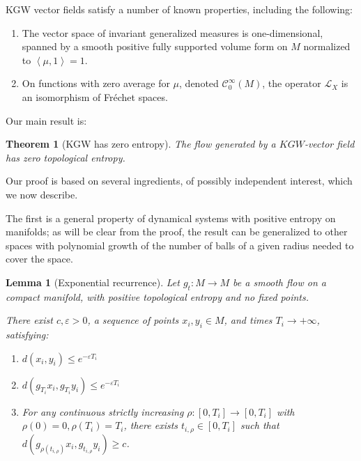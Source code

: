 \documentclass[11pt]{amsart}
\newcommand \cC {\mathcal{C}}
\newcommand \cL {\mathcal{L}}
\newcommand{\ip}[1]{\left\langle#1\right\rangle}
\newcommand{\Frechet}     {\xspace{{F}r\'echet}\xspace}
\newcommand{\ve}{\varepsilon}
\theoremstyle{mytheoremstyle}
\theoremstyle{mydefinitionstyle}
\theoremstyle{mytheoremstyle}
\newtheorem{theorem}{Theorem}[section]
\numberwithin{equation}{section}
\newtheorem{lemma}[lemma]{Lemma}
\theoremstyle{mydefinitionstyle}
\begin{document}
KGW vector fields satisfy a number of known properties, including the following:
\begin{enumerate}
	\item The vector space of invariant generalized measures is one-dimensional, spanned by a smooth positive fully supported volume form on $M$ normalized to $\ip{\mu,1}=1$.
	\item On functions with zero average for $\mu$, denoted $\cC^\infty_0(M)$, the operator $\cL_X$ is an isomorphism of \Frechet spaces.
\end{enumerate}
Our main result is:
\begin{theorem}[KGW has zero entropy]
	\label{thm:KGW-has-zero-entropy}
	The flow generated by a $KGW$-vector field has zero topological entropy.
\end{theorem}

Our proof is based on several ingredients, of possibly independent interest, which we now describe.

The first is a general property of dynamical systems with positive entropy on manifolds; as will be clear from the proof, the result can be generalized to other spaces with polynomial growth of the number of balls of a given radius needed to cover the space.


\begin{lemma}[Exponential recurrence]
	\label{lemma:Exponential-recurrence-flows}
	Let $g_t\colon M\to M$ be a smooth flow on a compact manifold, with positive topological entropy and no fixed points.

	There exist $c,\ve>0$, a sequence of points $x_i,y_i\in M$, and times $T_i\to +\infty$, satisfying:
	\begin{enumerate}
		\item $d(x_i,y_i)\leq e^{-\ve T_i}$
		\item $d\left(g_{T_i}x_i,g_{T_i}y_i\right)\leq e^{-\ve T_i}$
		\item 
		\label{item:exp_rec_separation_flows}
		For any continuous strictly increasing $\rho\colon [0,T_i]\to [0,T_i]$ with $\rho(0)=0,\rho(T_i)=T_i$, there exists $t_{i,\rho}\in [0,T_i]$ such that $d\left(g_{\rho(t_{i,\rho})}x_i,g_{t_{i,\rho}}y_i\right)\geq c$.
	\end{enumerate}
\end{lemma}
\end{document}
